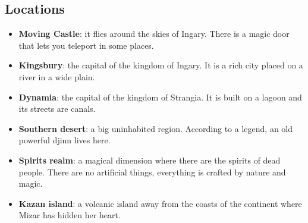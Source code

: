 \subsection{Locations}
\begin{itemize}
	\item \textbf{Moving Castle}: it flies around the skies of Ingary. There is a magic door that lets you teleport in some places.
	\item \textbf{Kingsbury}: the capital of the kingdom of Ingary. It is a rich city placed on a river in a wide plain.
	\item \textbf{Dynamia}: the capital of the kingdom of Strangia. It is built on a lagoon and its streets are canals.
	\item \textbf{Southern desert}: a big uninhabited region. According to a legend, an old powerful djinn lives here.
	\item \textbf{Spirits realm}: a magical dimension where there are the spirits of dead people. There are no artificial things, everything is crafted by nature and magic.
	\item \textbf{Kazan island}: a volcanic island away from the coasts of the continent where Mizar has hidden her heart.

\end{itemize}
